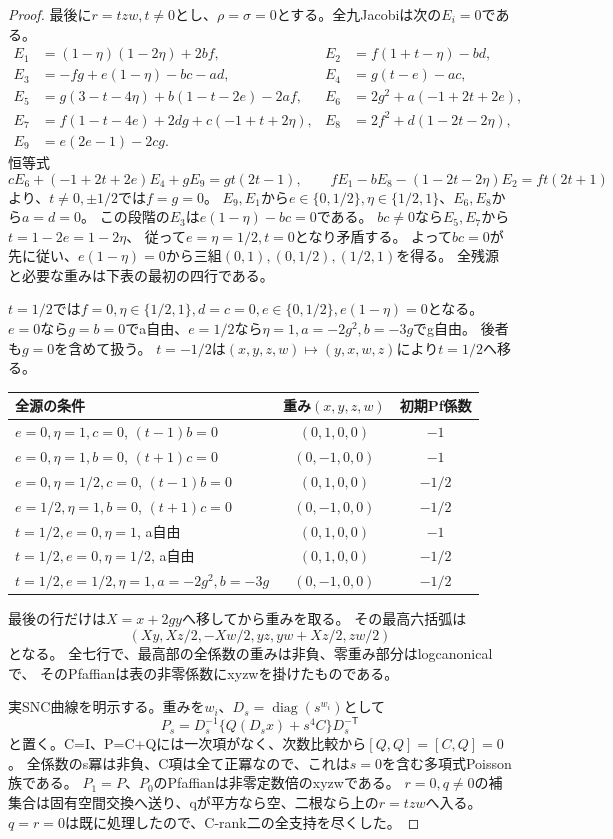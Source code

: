 \documentclass[a4paper,11pt]{ltjsarticle}
\theoremstyle{definition}
\begin{document}
\begin{proof}
最後に$r=tzw,t\ne0$とし、$\rho=\sigma=0$とする。全九Jacobiは次の$E_i=0$である。
\[
\begin{aligned}
 E_1&=(1-\eta)(1-2\eta)+2bf,&E_2&=f(1+t-\eta)-bd,\\
 E_3&=-fg+e(1-\eta)-bc-ad,&E_4&=g(t-e)-ac,\\
 E_5&=g(3-t-4\eta)+b(1-t-2e)-2af,&E_6&=2g^2+a(-1+2t+2e),\\
 E_7&=f(1-t-4e)+2dg+c(-1+t+2\eta),&E_8&=2f^2+d(1-2t-2\eta),\\
 E_9&=e(2e-1)-2cg.
\end{aligned}
\]
恒等式
\[
 cE_6+(-1+2t+2e)E_4+gE_9=gt(2t-1),\qquad
 fE_1-bE_8-(1-2t-2\eta)E_2=ft(2t+1)
\]
より、$t\ne0,\pm1/2$では$f=g=0$。
$E_9,E_1$から$e\in\{0,1/2\},\eta\in\{1/2,1\}$、$E_6,E_8$から$a=d=0$。
この段階の$E_3$は$e(1-\eta)-bc=0$である。
$bc\ne0$なら$E_5,E_7$から$t=1-2e=1-2\eta$、
従って$e=\eta=1/2,t=0$となり矛盾する。
よって$bc=0$が先に従い、$e(1-\eta)=0$から三組$(0,1),(0,1/2),(1/2,1)$を得る。
全残源と必要な重みは下表の最初の四行である。

$t=1/2$では$f=0,\eta\in\{1/2,1\},d=c=0,e\in\{0,1/2\},e(1-\eta)=0$となる。
$e=0$なら$g=b=0$でa自由、$e=1/2$なら$\eta=1,a=-2g^2,b=-3g$でg自由。
後者も$g=0$を含めて扱う。
$t=-1/2$は$(x,y,z,w)\mapsto(y,x,w,z)$により$t=1/2$へ移る。
\begin{center}\small
\begin{tabular}{l|c|c}
全源の条件&重み$(x,y,z,w)$&初期Pf係数\\\hline
$e=0,\eta=1,c=0$, $(t-1)b=0$&$(0,1,0,0)$&$-1$\\
$e=0,\eta=1,b=0$, $(t+1)c=0$&$(0,-1,0,0)$&$-1$\\
$e=0,\eta=1/2,c=0$, $(t-1)b=0$&$(0,1,0,0)$&$-1/2$\\
$e=1/2,\eta=1,b=0$, $(t+1)c=0$&$(0,-1,0,0)$&$-1/2$\\
$t=1/2,e=0,\eta=1$, a自由&$(0,1,0,0)$&$-1$\\
$t=1/2,e=0,\eta=1/2$, a自由&$(0,1,0,0)$&$-1/2$\\
$t=1/2,e=1/2,\eta=1,a=-2g^2,b=-3g$&$(0,-1,0,0)$&$-1/2$
\end{tabular}
\end{center}
最後の行だけは$X=x+2gy$へ移してから重みを取る。
その最高六括弧は
\[
 (Xy,Xz/2,-Xw/2,yz,yw+Xz/2,zw/2)
\]
となる。
全七行で、最高部の全係数の重みは非負、零重み部分はlogcanonicalで、
そのPfaffianは表の非零係数にxyzwを掛けたものである。

実SNC曲線を明示する。重みを$w_i$、$D_s=\operatorname{diag}(s^{w_i})$として
\[
 P_s=D_s^{-1}\{Q(D_sx)+s^4C\}D_s^{-\mathsf T}
\]
と置く。C=I、P=C+Qには一次項がなく、次数比較から$[Q,Q]=[C,Q]=0$。
全係数のs冪は非負、C項は全て正冪なので、これは$s=0$を含む多項式Poisson族である。
$P_1=P$、$P_0$のPfaffianは非零定数倍のxyzwである。
$r=0,q\ne0$の補集合は固有空間交換へ送り、qが平方なら空、二根なら上の$r=tzw$へ入る。
$q=r=0$は既に処理したので、C-rank二の全支持を尽くした。


\end{proof}
\end{document}
